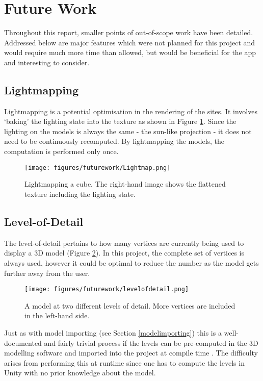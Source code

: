 \documentclass[12pt, a4paper]{article}
\begin{document}
\newpage
\section{Future Work}
\label{futurework}
Throughout this report, smaller points of out-of-scope work have been detailed. Addressed below are major features which were not planned for this project and would require much more time than allowed, but would be beneficial for the app and interesting to consider.

\subsection{Lightmapping}
Lightmapping is a potential optimisation in the rendering of the sites. It involves `baking' the lighting state into the texture as shown in Figure \ref{fig:lightmapping}. Since the lighting on the models is always the same - the sun-like projection - it does not need to be continuously recomputed. By lightmapping the models, the computation is performed only once.

\begin{figure}[h]
\centering
    \texttt{[image: figures/futurework/Lightmap.png]}
        \caption{Lightmapping a cube. The right-hand image shows the flattened texture including the lighting state. \cite{futurework:lightmapping}}
        \label{fig:lightmapping}
\end{figure}

\subsection{Level-of-Detail}
The level-of-detail pertains to how many vertices are currently being used to display a 3D model (Figure \ref{fig:levelofdetail}). In this project, the complete set of vertices is always used, however it could be optimal to reduce the number as the model gets further away from the user.

\begin{figure}
\centering
    \texttt{[image: figures/futurework/levelofdetail.png]}
        \caption{A model at two different levels of detail. More vertices are included in the left-hand side. \cite{futurework:levelofdetail}}
        \label{fig:levelofdetail}
\end{figure}

Just as with model importing (see Section \ref{modelimporting}) this is a well-documented and fairly trivial process if the levels can be pre-computed in the 3D modelling software and imported into the project at compile time \cite{futurework:levelofdetail} \cite{futurework:LODbrackeys}. The difficulty arises from performing this at runtime since one has to compute the levels in Unity with no prior knowledge about the model.
\end{document}
